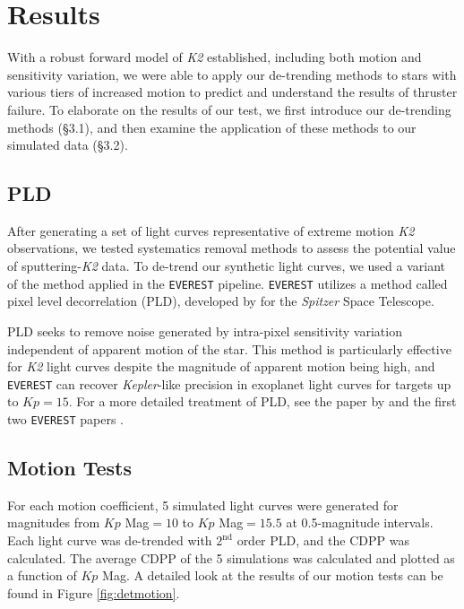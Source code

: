 \documentclass[12pt,preprint]{aastex}
\begin{document}
\section{Results}

With a robust forward model of \textit{K2} established, including both motion and sensitivity variation, we were able to apply our de-trending methods to stars with various tiers of increased motion to predict and understand the results of thruster failure. To elaborate on the results of our test, we first introduce our de-trending methods (\S 3.1), and then examine the application of these methods to our simulated data (\S 3.2).

\subsection{PLD}

After generating a set of light curves representative of extreme motion \textit{K2} observations, we tested systematics removal methods to assess the potential value of sputtering-\textit{K2} data. To de-trend our synthetic light curves, we used a variant of the method applied in the \texttt{EVEREST} pipeline. \texttt{EVEREST} utilizes a method called pixel level decorrelation (PLD), developed by \cite{0004-637X-805-2-132} for the \textit{Spitzer} Space Telescope.

PLD seeks to remove noise generated by intra-pixel sensitivity variation independent of apparent motion of the star. This method is particularly effective for \textit{K2} light curves despite the magnitude of apparent motion being high, and \texttt{EVEREST} can recover \textit{Kepler}-like precision in exoplanet light curves for targets up to $Kp = 15$. For a more detailed treatment of PLD, see the paper by \cite{0004-637X-805-2-132} and the first two \texttt{EVEREST} papers \citep{2016AJ....152..100L,2017arXiv170205488L}.

\subsection{Motion Tests}

For each motion coefficient, 5 simulated light curves were generated for magnitudes from $Kp$ Mag$=10$ to $Kp$ Mag$=15.5$ at 0.5-magnitude intervals. Each light curve was de-trended with $2^{\text{nd}}$ order PLD, and the CDPP was calculated. The average CDPP of the 5 simulations was calculated and plotted as a function of $Kp$ Mag. A detailed look at the results of our motion tests can be found in Figure \ref{fig:detmotion}.
\end{document}
